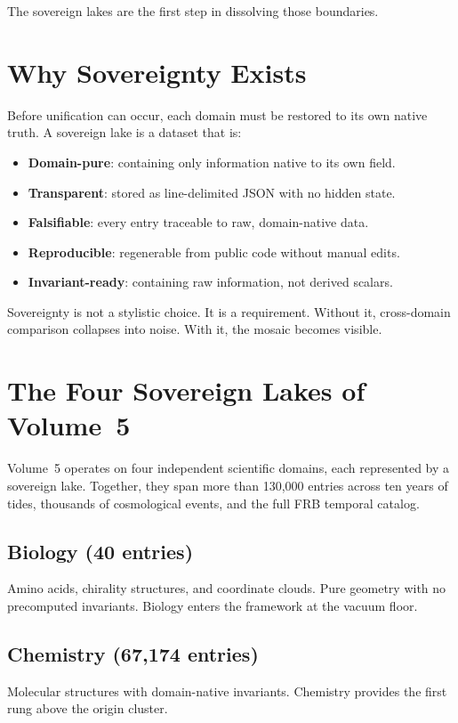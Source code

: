\documentclass[11pt, letterpaper, openany]{book}
\begin{document}
The sovereign lakes are the first step in dissolving those boundaries.

\section*{Why Sovereignty Exists}
Before unification can occur, each domain must be restored to its own native truth. A sovereign lake
is a dataset that is:

\begin{itemize}
    \item \textbf{Domain-pure}: containing only information native to its own field.
    \item \textbf{Transparent}: stored as line-delimited JSON with no hidden state.
    \item \textbf{Falsifiable}: every entry traceable to raw, domain-native data.
    \item \textbf{Reproducible}: regenerable from public code without manual edits.
    \item \textbf{Invariant-ready}: containing raw information, not derived scalars.
\end{itemize}

Sovereignty is not a stylistic choice. It is a requirement.  
Without it, cross-domain comparison collapses into noise.  
With it, the mosaic becomes visible.

\section*{The Four Sovereign Lakes of Volume~5}
Volume~5 operates on four independent scientific domains, each represented by a sovereign lake.
Together, they span more than 130,000 entries across ten years of tides, thousands of cosmological
events, and the full FRB temporal catalog.

\subsection*{Biology (40 entries)}
Amino acids, chirality structures, and coordinate clouds. Pure geometry with no precomputed
invariants. Biology enters the framework at the vacuum floor.

\subsection*{Chemistry (67,174 entries)}
Molecular structures with domain-native invariants. Chemistry provides the first rung above the
origin cluster.
\end{document}
